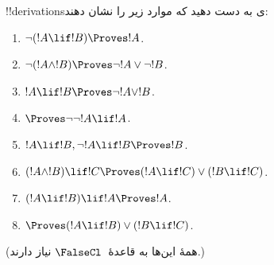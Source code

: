 \documentclass[../../../include/open-logic-section]{subfiles}
\begin{document}
\begin{prob}
!!{derivation}sی به دست دهید که موارد زیر را نشان دهند:
\begin{enumerate}
\item $\lnot(!A \lif !B) \Proves !A$.
\item $\lnot(!A \land !B) \Proves \lnot !A \lor \lnot !B$.
\item $!A \lif !B \Proves \lnot !A \lor !B$.
\item $\Proves \lnot \lnot !A \lif !A$.
\item $!A \lif !B, \lnot !A \lif !B \Proves !B$.
\item $(!A \land !B) \lif !C \Proves (!A \lif !C) \lor (!B \lif !C)$.
\item $(!A \lif !B) \lif !A \Proves !A$.
\item $\Proves (!A \lif !B) \lor (!B \lif !C)$.
\end{enumerate}
(همهٔ این‌ها به قاعدهٔ~$\FalseCl$ نیاز دارند.)
\end{prob}
\end{document}
